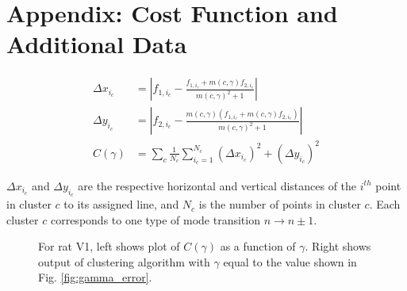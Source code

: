 \documentclass[superscriptaddress, twocolumn, prl]{revtex4}
\begin{document}
\appendix
\section{\label{App:add_data}Appendix: Cost Function and Additional Data}
\begin{align*}
\label{eq:cost}
\Delta x_{i_{c}} &= \left\vert f_{1,i_{c}}-\frac{f_{1,i_{c}}+m\left(c,\gamma\right)f_{2,i_{c}}}{m\left(c,\gamma\right)^{2}+1}\right\vert
\\ \Delta y_{i_c} &= \left\vert f_{2,i_{c}}-\frac{m\left(c,\gamma\right)\left(f_{1,i_{c}}+m\left(c,\gamma\right)f_{2,i_{c}}\right)}{m\left(c,\gamma\right)^{2}+1}  \right\vert
\\ C\left(\gamma\right) &= \sum_{c}\frac{1}{N_{c}}\sum_{i_c=1}^{N_{c}}\left(\Delta x_{i_c}\right)^{2}+\left(\Delta y_{i_c}\right)^{2}
\end{align*}

$\Delta x_{i_c}$ and $\Delta y_{i_c}$ are the respective horizontal and vertical distances of the $i^{th}$ point in cluster $c$ to its assigned line, and $N_{c}$ is the number of points in cluster $c$. Each cluster $c$ corresponds to one type of mode transition $n \rightarrow n\pm1$.

\begin{figure}[ht]
\centering
{}
\caption{For rat V1, left shows plot of $C\left(\gamma \right)$ as a function of $\gamma$. Right shows output of clustering algorithm with $\gamma$ equal to the value shown in Fig. \ref{fig:gamma_error}.}
\end{figure}
\end{document}

